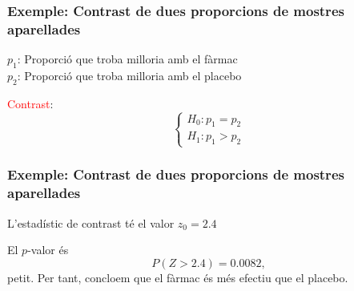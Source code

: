 \documentclass[12pt,t]{beamer}
\newcommand{\red}[1]{\textcolor{red}{#1}}
\renewcommand{\emph}[1]{{\color{red}#1}}
\renewcommand{\geq}{\geqslant}
\theoremstyle{plain}
\theoremstyle{definition}
\begin{document}
\begin{frame}
\frametitle{Exemple: Contrast de dues proporcions de mostres aparellades}

$p_1$: Proporció que troba milloria amb el fàrmac\\
$p_2$: Proporció que troba milloria amb el placebo
\medskip

\red{Contrast}:
$$
\left\{\begin{array}{l}
H_0:p_1=p_2\\
H_1:p_1> p_2
\end{array}\right.
$$
\end{frame}




\begin{frame}
\frametitle{Exemple: Contrast de dues proporcions de mostres aparellades}

L'estadístic de contrast té el valor $z_0=2.4$
\medskip

El $p$-valor és
$$
P(Z>2.4)=0.0082,
$$
petit. Per tant, concloem que el fàrmac és més efectiu que el placebo.
\end{frame}
\end{document}
